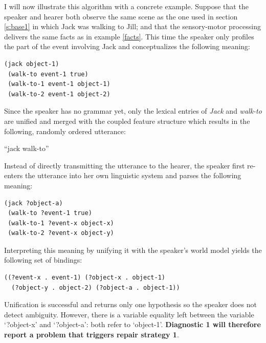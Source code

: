 I will now illustrate this algorithm with a concrete example. Suppose that the speaker and hearer both observe the same scene as the one used in section \ref{s:base1} in which Jack was walking to Jill; and that the sensory-motor processing delivers the same facts as in example \ref{facts}. This time the speaker only profiles the part of the event involving Jack and conceptualizes the following meaning:

\ea
\begin{lstlisting}
(jack object-1)
 (walk-to event-1 true)
 (walk-to-1 event-1 object-1)
 (walk-to-2 event-1 object-2)
\end{lstlisting}
\z

Since the speaker has no grammar yet, only the lexical entries of {\em Jack} and {\em walk-to} are unified and merged with the coupled feature structure which results in the following, randomly ordered utterance:

\ea
``jack walk-to''
\z

Instead of directly transmitting the utterance to the hearer, the speaker first re-enters the utterance into her own linguistic system and parses the following meaning:

\ea
\begin{lstlisting}
(jack ?object-a)
 (walk-to ?event-1 true)
 (walk-to-1 ?event-x object-x)
 (walk-to-2 ?event-x object-y)
\end{lstlisting}
\z

Interpreting this meaning by unifying it with the speaker's world model yields the following set of bindings:

\ea
\begin{lstlisting}
((?event-x . event-1) (?object-x . object-1)
  (?object-y . object-2) (?object-a . object-1))
\end{lstlisting}
\z

Unification is successful and returns only one hypothesis so the speaker does not detect ambiguity. However, there is a variable equality left between the variable `?object-x' and `?object-a': both refer to `object-1'. {\bfseries Diagnostic 1 will therefore report a problem that triggers repair strategy 1}.

